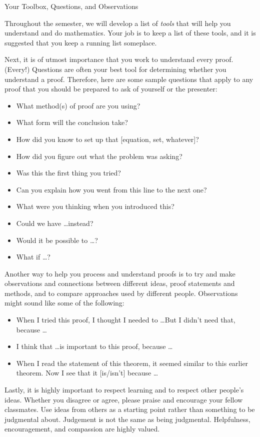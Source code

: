 \begin{section}{Your Toolbox, Questions, and Observations}

Throughout the semester, we will develop a list of \emph{tools} that will help you understand and do mathematics. Your job is to keep a list of these tools, and it is suggested that you keep a running list someplace.

Next, it is of utmost importance that you work to understand every proof. (Every!)  Questions are often your best tool for determining whether you understand a proof.  Therefore, here are some sample questions that apply to any proof that you should be prepared to ask of yourself or the presenter:
\begin{itemize}
\item What method(s) of proof are you using?
\item What form will the conclusion take?
\item How did you know to set up that [equation, set, whatever]?
\item How did you figure out what the problem was asking?
\item Was this the first thing you tried?
\item Can you explain how you went from this line to the next one?
\item What were you thinking when you introduced this?
\item Could we have \ldots instead?
\item Would it be possible to \ldots?
\item What if \ldots?
\end{itemize}

Another way to help you process and understand proofs is to try and make observations and connections between different ideas, proof statements and methods, and to compare approaches used by different people. Observations might sound like some of the following:
\begin{itemize}
\item When I tried this proof, I thought I needed to \ldots But I didn't need that, because \ldots
\item I think that \ldots is important to this proof, because \ldots
\item When I read the statement of this theorem, it seemed similar to this earlier theorem. Now I see that it [is/isn't] because \ldots
\end{itemize}

Lastly, it is highly important to respect learning and to respect other people's ideas.  Whether you disagree or agree, please praise and encourage your fellow classmates.  Use ideas from others as a starting point rather than something to be judgmental about.  Judgement is not the same as being judgmental.  Helpfulness, encouragement, and compassion are highly valued.

\end{section}

